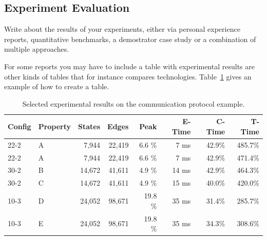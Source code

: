 \subsection{Experiment Evaluation}

Write about the results of your experiments, either via personal experience reports, quantitative benchmarks, a demostrator case study or a combination of multiple approaches.


For some reports you may have to include a table with experimental
results are other kinds of tables that for instance compares
technologies. Table~\ref{tab:results} gives an example of how to create a table.

\begin{table}[bth]
	\centering
	\begin{tabular}{llrrrrrr}
		Config & Property & States & Edges & Peak & E-Time & C-Time & T-Time
		\\ \hline \hline
		22-2 & A   &    7,944  &   22,419  &  6.6  \%  &  7 ms & 42.9\% &  485.7\% \\
		22-2 & A   &    7,944  &   22,419  &  6.6  \%  &  7 ms & 42.9\% &  471.4\% \\
		30-2 & B   &   14,672  &   41,611  &  4.9  \%  & 14 ms & 42.9\% &  464.3\% \\
		30-2 & C   &   14,672  &   41,611  &  4.9  \%  & 15 ms & 40.0\% &  420.0\% \\ \hline
		10-3 & D   &   24,052  &   98,671  & 19.8  \%  & 35 ms & 31.4\% &  285.7\% \\
		10-3 & E   &   24,052  &   98,671  & 19.8  \%  & 35 ms & 34.3\% &  308.6\% \\
		\hline \hline
	\end{tabular}
	\caption{Selected experimental results on the communication protocol example.}
	\label{tab:results}
\end{table}
